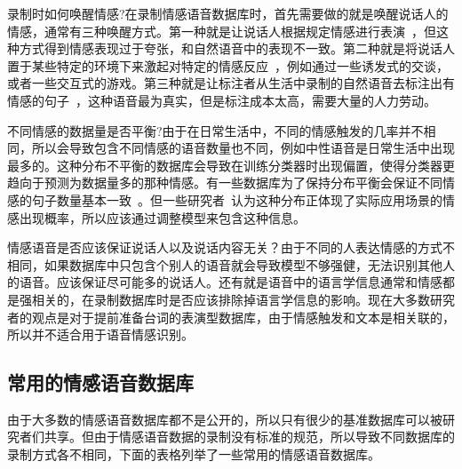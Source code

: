 录制时如何唤醒情感?在录制情感语音数据库时，首先需要做的就是唤醒说话人的情感，通常有三种唤醒方式。第一种就是让说话人根据规定情感进行表演~\cite{Lee2005Toward}，但这种方式得到情感表现过于夸张，和自然语音中的表现不一致。第二种就是将说话人置于某些特定的环境下来激起对特定的情感反应~\cite{Batliner2000Desperately}，例如通过一些诱发式的交谈，或者一些交互式的游戏。第三种就是让标注者从生活中录制的自然语音去标注出有情感的句子~\cite{Johnstone2005Affective}，这种语音最为真实，但是标注成本太高，需要大量的人力劳动。

不同情感的数据量是否平衡?由于在日常生活中，不同的情感触发的几率并不相同，所以会导致包含不同情感的语音数量也不同，例如中性语音是日常生活中出现最多的。这种分布不平衡的数据库会导致在训练分类器时出现偏置，使得分类器更趋向于预测为数据量多的那种情感。有一些数据库为了保持分布平衡会保证不同情感的句子数量基本一致~\cite{Burkhardt2005A}。但一些研究者~\cite{Hansen1997Getting, Morrison2007Ensemble}认为这种分布正体现了实际应用场景的情感出现概率，所以应该通过调整模型来包含这种信息。

情感语音是否应该保证说话人以及说话内容无关？由于不同的人表达情感的方式不相同，如果数据库中只包含个别人的语音就会导致模型不够强健，无法识别其他人的语音。应该保证尽可能多的说话人。还有就是语音中的语言学信息通常和情感都是强相关的，在录制数据库时是否应该排除掉语言学信息的影响。现在大多数研究者的观点是对于提前准备台词的表演型数据库，由于情感触发和文本是相关联的，所以并不适合用于语音情感识别。

\subsection{常用的情感语音数据库}
\label{ssec:available_database}
由于大多数的情感语音数据库都不是公开的，所以只有很少的基准数据库可以被研究者们共享。但由于情感语音数据的录制没有标准的规范，所以导致不同数据库的录制方式各不相同，下面的表格列举了一些常用的情感语音数据库。

